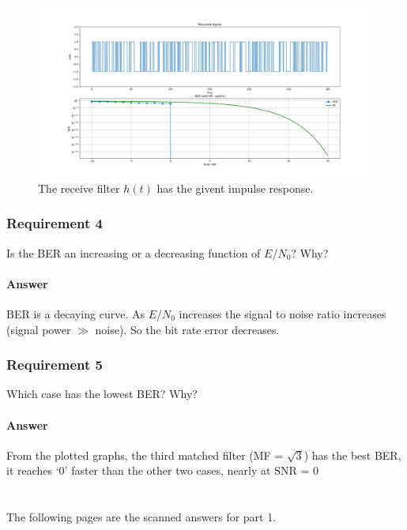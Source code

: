 \documentclass[
	12pt, %
	oneside
]{fphw}
\begin{document}
\begin{figure}[hp]
	\centering
	\includegraphics[width=17cm]{../graphs/3}
	\caption{The receive filter $h(t)$ has the givent impulse response.}
	\label{plot:ber3}
\end{figure}


\clearpage
\section*{Requirement 4}
\begin{problem}
	Is the BER an increasing or a decreasing function of $E$/$N_0$? Why?
\end{problem}

\subsection*{Answer}
BER is a decaying curve. As $E$/$N_0$ increases the signal to noise ratio increases (signal power $\gg$ noise). So the bit rate error decreases.

\section*{Requirement 5}
\begin{problem}
	Which case has the lowest BER? Why?
\end{problem}
\subsection*{Answer}
From the plotted graphs, the third matched filter (MF = $\sqrt{3}$) has the best BER, it reaches ‘0’ faster than the other two cases, nearly at SNR = 0

\setcounter{part}{0}
\part{}
The following pages are the scanned answers for part 1.

\end{document}
